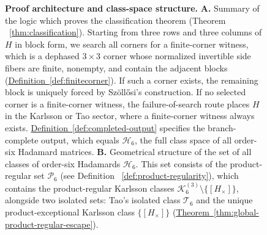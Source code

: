 \documentclass[aps,prx,reprint,nofootinbib,twoside,superscriptaddress,longbibliography,floatfix]{revtex4-2}
\theoremstyle{definition}
\newcommand{\HH}{\mathcal H}
\newcommand{\KK}{\mathcal K}
\begin{document}
\begin{figure}[htb!]
\vspace{2pt}
\caption{\textbf{Proof architecture and class-space structure.} \textbf{A.} Summary of the logic which proves the classification theorem (Theorem ~\ref{thm:classification}). Starting from three rows and three columns of $H$ in block form, we search all corners for a finite-corner witness, which is a dephased $3\times3$ corner whose normalized invertible side fibers are finite, nonempty, and contain the adjacent blocks (\hyperref[def:finitecorner]{Definition~\ref*{def:finitecorner}}). If such a corner exists, the remaining block is uniquely forced by Sz\"oll\H{o}si's construction. If no selected corner is a finite-corner witness, the failure-of-search route places $H$ in the Karlsson or Tao sector, where a finite-corner witness always exists. 
\hyperref[def:completed-output]{Definition~\ref*{def:completed-output}} specifies the branch-complete output, which equals $\HH_6$, the full class space of all order-six Hadamard matrices. \textbf{B.} Geometrical structure of the set of all classes of order-six Hadamards $\HH_6$.
This set consists of the product-regular set $\mathcal P_6$ (see Definition ~\ref{def:product-regularity}), which contains the product-regular Karlsson classes $\KK_6^{(3)}\setminus\{[H_\times]\}$, alongside two isolated sets: Tao's isolated class $\mathcal T_6$ and the unique product-exceptional Karlsson class $\{[H_\times]\}$ (\hyperref[thm:global-product-regular-escape]{Theorem~\ref*{thm:global-product-regular-escape}}).}
\label{fig:finite-corner-proof}
\endgroup
\end{figure}
\end{document}
